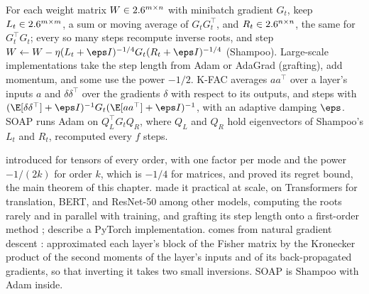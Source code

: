 \begin{refsection}
\begin{practice}
For each weight matrix $W\in2.6^{m\times n}$ with minibatch gradient $G_t$, keep $L_t\in2.6^{m\times m}$, a sum or moving average of $G_tG_t^\top$, and $R_t\in2.6^{n\times n}$, the same for $G_t^\top G_t$; every so many steps recompute inverse roots, and step $W\leftarrow W-\eta(L_t+\eps I)^{-1/4}G_t(R_t+\eps I)^{-1/4}$ (Shampoo). Large-scale implementations take the step length from Adam or AdaGrad (grafting), add momentum, and some use the power $-1/2$. K-FAC averages $aa^\top$ over a layer's inputs $a$ and $\delta\delta^\top$ over the gradients $\delta$ with respect to its outputs, and steps with $(\E[\delta\delta^\top]+\eps I)^{-1}G_t(\E[aa^\top]+\eps I)^{-1}$, with an adaptive damping $\eps$. SOAP runs Adam on $Q_L^\top G_tQ_R$, where $Q_L$ and $Q_R$ hold eigenvectors of Shampoo's $L_t$ and $R_t$, recomputed every $f$ steps.
\end{practice}

\Textcite{GuptaKorenSinger2018} introduced  for tensors of every order, with one factor per mode and the power $-1/(2k)$ for order $k$, which is $-1/4$ for matrices, and proved its regret bound, the main theorem of this chapter. \Textcite{AnilEtAl2020} made it practical at scale, on Transformers for translation, BERT, and ResNet-50 among other models, computing the roots rarely and in parallel with training, and grafting its step length onto a first-order method \parencite{AgarwalEtAl2020Grafting}; \textcite{ShiEtAl2023} describe a PyTorch implementation.  comes from natural gradient descent \parencite{Amari1998}: \textcite{MartensGrosse2015} approximated each layer's block of the Fisher matrix by the Kronecker product of the second moments of the layer's inputs and of its back-propagated gradients, so that inverting it takes two small inversions. SOAP \parencite{VyasEtAl2025} is Shampoo with Adam inside.


\end{refsection}
